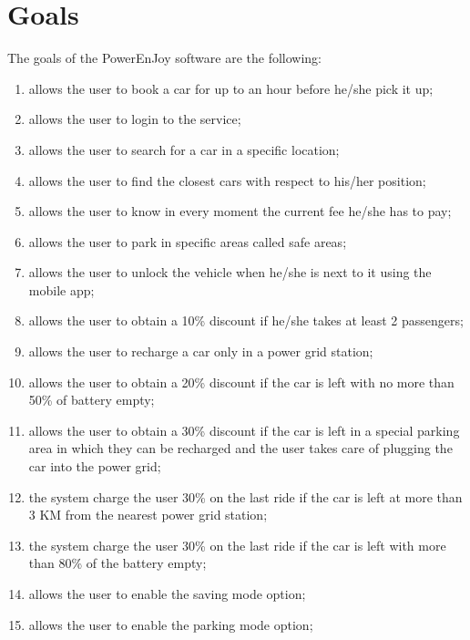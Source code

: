 \section{Goals}
The goals of the PowerEnJoy software are the following:
\begin{enumerate}
	\item allows the user to book a car for up to an hour before he/she pick it up;
	\item allows the user to login to the service;  
	\item allows the user to search for a car in a specific location; 
	\item allows the user to find the closest cars with respect to his/her position; 
	\item allows the user to know in every moment the current fee he/she has to pay;
	\item allows the user to park in specific areas called safe areas;
	\item allows the user to unlock the vehicle when he/she is next to it using the mobile app;
	\item allows the user to obtain a 10\% discount if he/she takes at least 2 passengers;
	\item allows the user to recharge a car only in a power grid station;
	\item allows the user to obtain a 20\% discount if the car is left with no more than 50\% of battery empty;
	\item allows the user to obtain a 30\% discount if the car is left in a special parking area in which they can be recharged and the user takes care of plugging the car into the power grid;
	\item the system charge the user 30\% on the last ride if the car is left at more than 3 KM from the nearest power grid station;
	\item the system charge the user 30\% on the last ride if the car is left with more than 80\% of the battery empty;
	\item allows the user to enable the saving mode option;
	\item allows the user to enable the parking mode option;
	
	
\end{enumerate}